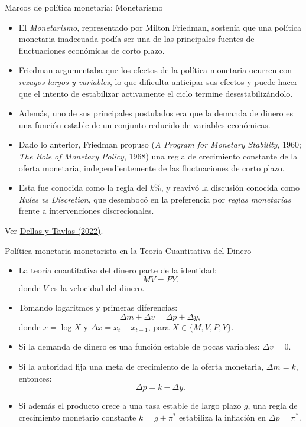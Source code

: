 \documentclass[aspectratio=169,11pt]{beamer}
\begin{document}
\begin{frame}{Marcos de política monetaria: Monetarismo}
  \small
  \begin{itemize}
    \item El \textit{Monetarismo}, representado por Milton Friedman, sostenía que una política monetaria inadecuada podía ser una de las principales fuentes de fluctuaciones económicas de corto plazo.

    \item Friedman argumentaba que los efectos de la política monetaria ocurren con \textit{rezagos largos y variables}, lo que dificulta anticipar sus efectos y puede hacer que el intento de estabilizar activamente el ciclo termine desestabilizándolo.

    \item Además, uno de sus principales postulados era que la demanda de dinero es una función estable de un conjunto reducido de variables económicas.

    \item Dado lo anterior, Friedman propuso (\textit{A Program for Monetary Stability}, 1960; \textit{The Role of Monetary Policy}, 1968) una regla de crecimiento constante de la oferta monetaria, independientemente de las fluctuaciones de corto plazo.

    \item Esta fue conocida como la regla del $k\%$, y reavivó la discusión conocida como \textit{Rules vs Discretion}, que desembocó en la preferencia por \textit{reglas monetarias} frente a intervenciones discrecionales.
  \end{itemize}

  {\footnotesize
  Ver
  \href{https://www.aeaweb.org/articles?id=10.1257/jep.36.3.245}
  {Dellas y Tavlas (2022)}.
  }
\end{frame}


\begin{frame}{Política monetaria monetarista en la Teoría Cuantitativa del Dinero}
\small
  \begin{itemize}
    \item La teoría cuantitativa del dinero parte de la identidad:
    \[
      MV = PY.
    \]
    donde $V$ es la velocidad del dinero.
    \item Tomando logaritmos y primeras diferencias:
    \[
      \Delta m + \Delta v = \Delta p + \Delta y,
    \]
    donde $x=\log X$ y $\Delta x = x_t - x_{t-1}$, para $X\in\{M,V,P,Y\}$.

    \item Si la demanda de dinero es una función estable de pocas variables: $\Delta v = 0$.

    \item Si la autoridad fija una meta de crecimiento de la oferta monetaria, $\Delta m = k$, entonces:
    \[
      \Delta p = k - \Delta y.
    \]
    \item Si además el producto crece a una tasa estable de largo plazo $g$, una regla de crecimiento monetario constante $k = g + \pi^*$ estabiliza la inflación en $\Delta p = \pi^*$.
  \end{itemize}
\end{frame}
\end{document}
